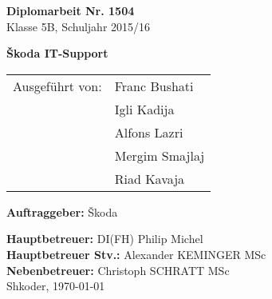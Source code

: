 
\newcommand{\trtitle}{\v{S}koda IT-Support}
\newcommand{\trort}{Shkoder}
\newcommand{\trbetreuer}{DI (FH) Philip MICHEL (Hauptbetreuer)}
\newcommand{\trfachgebiet}{SEW, INSY, NWTK }
\newcommand{\trdate}{\today}
\newcommand{\trnumber}{1504}
\newcommand{\trclass}{5B}
\newcommand{\trschuelereins}{Franc Bushati}
\newcommand{\trschuelerzwei}{Igli Kadija}
\newcommand{\trschuelerdrei}{Alfons Lazri}
\newcommand{\trschuelervier}{Mergim Smajlaj}
\newcommand{\trschuelerfuenf}{Riad Kavaja}
\newcommand{\trsauftraggeber}{\v{S}koda}
\newcommand{\trbetreuereins}{DI(FH) Philip Michel}
\newcommand{\trbetreuerzwei}{Alexander KEMINGER MSc}
\newcommand{\trbetreuerdrei}{Christoph SCHRATT MSc}
\newcommand{\trbetreuervier}{Mag. Anita AIGNER}

\thispagestyle{empty}

\vspace{0.1cm}
\begin{flushleft}
\textbf{\LARGE Diplomarbeit Nr. \trnumber} \\
\LARGE Klasse \trclass{}, Schuljahr 2015/16

\vspace{9cm}
\textbf{\LARGE \trtitle}

\vspace{0.5cm}
\begin{table}[htbp]
\large
\begin{tabular}{cl}
   Ausgef\"uhrt von: & \trschuelereins \\ 
   & \trschuelerzwei \\ 
   & \trschuelerdrei \\ 
    & \trschuelervier \\ 
     & \trschuelerfuenf \\ 
 \end{tabular}
\end{table}
\end{flushleft}

\vspace{0.2cm}
\textbf{Auftraggeber:} \trsauftraggeber

\vspace{0.4cm}
\textbf{Hauptbetreuer:} \trbetreuereins \\
\textbf{Hauptbetreuer Stv.:} \trbetreuerzwei \\
\textbf{Nebenbetreuer:} \trbetreuerdrei \\
\newline
\large \trort{}, \today 

\vfill
